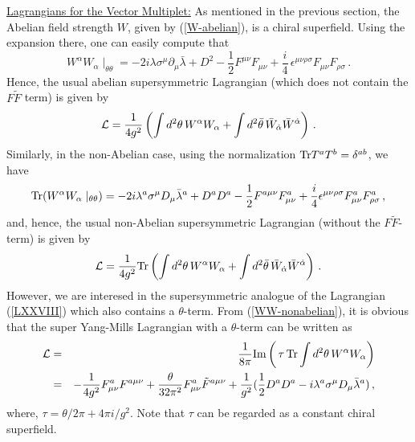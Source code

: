 \noindent\underline{Lagrangians for the Vector Multiplet:}
\noindent As mentioned in the previous section, the Abelian field
strength $W$, given by (\ref{W-abelian}), is a chiral
superfield. Using the expansion there, one can easily compute that 
$$
W^\alpha W_\alpha\mid_{\theta\theta}=-2i\lambda\sigma^\mu\partial_\mu
\bar{\lambda} + D^2 - \frac{1}{2} F^{\mu\nu} F_{\mu\nu} +\frac{i}{4} \,
\epsilon^{\mu\nu\rho\sigma} F_{\mu\nu}F_{\rho\sigma}\,.
$$
Hence, the usual abelian supersymmetric Lagrangian (which does not
contain the $F\widetilde F$ term) is given by    
$$
{\cal L}=\frac{1}{4g^{2}}\left(\int d^2\theta\, W^\alpha W_\alpha +
\int d^2\bar\theta\, \bar{W}_{\dot\alpha} \bar{W}^{\dot\alpha}\right)\,.
$$
Similarly, in the non-Abelian case, using the normalization 
${\rm Tr}T^aT^b=\delta^{ab}$, we have
\begin{equation}
{\rm Tr}(W^\alpha W_\alpha \mid_{\theta\theta})=-2i\lambda^a\sigma^\mu 
D_\mu \bar{\lambda}^a +D^a D^a -\frac{1}{2} F^{a\mu\nu}
F^a_{\mu\nu} +\frac{i}{4}\epsilon^{\mu\nu\rho\sigma} F^a_{\mu\nu} 
F^a_{\rho\sigma}\,,
\label{WW-nonabelian}
\end{equation}
and, hence, the usual non-Abelian supersymmetric Lagrangian (without
the $F\widetilde F$-term) is given by 
$$
{\cal L}=\frac{1}{4g^2}{\rm Tr}\left(\int d^2\theta\, W^\alpha W_\alpha 
+\int d^2\bar\theta\, \bar{W}_{\dot\alpha}\bar{W}^{\dot\alpha}\right)\,.
$$
However, we are interesed in the supersymmetric analogue of the
Lagrangian (\ref{LXXVIII}) which also contains a $\theta$-term.
From (\ref{WW-nonabelian}), it is obvious that the super Yang-Mills
Lagrangian with a $\theta$-term can be written as 
\begin{eqnarray}
{\cal L}&=&\frac{1}{8\pi}{\rm Im}\left(\,\tau\,{\rm Tr}\int d^2\theta\,
W^\alpha W_\alpha \right) \nonumber\\
&=&-\frac{1}{4g^2} F^a_{\mu\nu}F^{a\mu\nu}+ \frac{\theta}{32\pi^2}  
F^a_{\mu\nu}\tilde F^{a\mu\nu}+ \frac{1}{g^2}(\frac{1}{2}D^a D^a 
-i\lambda^a\sigma^\mu D_\mu\bar{\lambda}^a) \,,
\label{tauWW}
\end{eqnarray}
where, $\tau = \theta/2\pi + 4\pi i/g^2$. Note that $\tau$ can be
regarded as a constant chiral superfield.  

